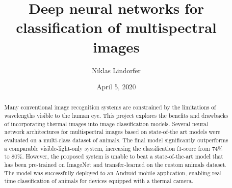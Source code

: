 \documentclass{l4proj}
\begin{document}
\title{Deep neural networks for classification of multispectral images}
\author{Niklas Lindorfer}
\date{April 5, 2020}

\maketitle

\begin{abstract}
    Many conventional image recognition systems are constrained by the limitations of wavelengths visible to the human eye.
    This project explores the benefits and drawbacks of incorporating thermal images into image classification models. Several neural network architectures for multispectral images based on state-of-the art models were evaluated on a multi-class dataset of animals.
    The final model significantly outperforms a comparable visible-light-only system, increasing the classification f1-score from $74\%$ to $80\%$. However, the proposed system is unable to beat a state-of-the-art model that has been pre-trained on ImageNet and transfer-learned on the custom animals dataset.
    The model was successfully deployed to an Android mobile application, enabling real-time classification of animals for devices equipped with a thermal camera.
\end{abstract}


%
%
\def\consentname {Niklas Lindorfer} %
\def\consentdate {26 September 2019} %
%
\educationalconsent
\end{document}
